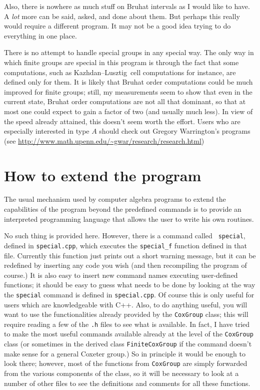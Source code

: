 \documentclass[11pt]{article}
\newcommand{\kl}{Kazh\-dan--Lusz\-tig}
\begin{document}
Also, there is nowhere as much stuff on Bruhat intervals as I would like to
have. A {\em lot} more can be said, asked, and done about them. But perhaps
this really would require a different program. It may not be a good idea trying
to do everything in one place.

There is no attempt to handle special groups in any special way. The only way
in which finite groups are special in this program is through the fact that
some computations, such as \kl\ cell computations for instance, are defined
only for them. It is likely that Bruhat order computations could be much
improved for finite groups; still, my measurements seem to show that even in
the current state, Bruhat order computations are not all that dominant, so that
at most one could expect to gain a factor of two (and usually much less). In
view of the speed already attained, this doesn't seem worth the effort. Users
who are especially interested in type $A$ should check out Gregory Warrington's
programs (see \url{http://www.math.upenn.edu/~gwar/research/research.html})

\section{How to extend the program}\label{section:extend}

The usual mechanism used by computer algebra programs to extend the
capabilities of the program beyond the predefined commands is to provide
an interpreted programming language that allows the user to write his own
routines.

No such thing is provided here. However, there is a command called {\tt
special}, defined in {\tt special.cpp}, which executes the {\tt special\_f}
function defined in that file. Currently this function just prints out a
short warning message, but it can be redefined by inserting any code you
wish (and then recompiling the program of course.) It is also easy to
insert new command names executing user-defined functions; it should be
easy to guess what needs to be done by looking at the way the {\tt special}
command is defined in {\tt special.cpp}. Of course this is only useful for
users which are knowledgeable with C++. Also, to do anything useful, you
will want to use the functionalities already provided by the {\tt CoxGroup}
class; this will require reading a few of the {\tt .h} files to see what is
available. In fact, I have tried to make the most useful commands available
already at the level of the {\tt CoxGroup} class (or sometimes in the derived
class {\tt FiniteCoxGroup} if the command doesn't make sense for a general
Coxeter group.) So in principle it would be enough to look there; however,
most of the functions from {\tt CoxGroup} are simply forwarded from the
various components of the class, so it will be necessary to look at a number
of other files to see the definitions and comments for all these functions.
\end{document}
